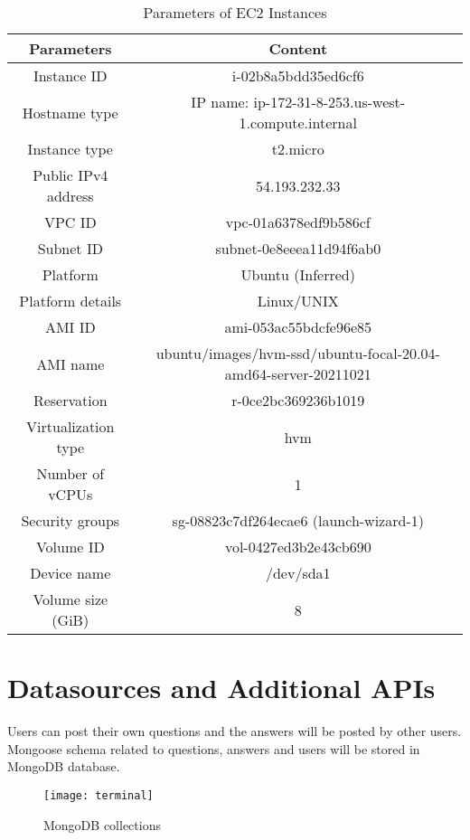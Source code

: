 \documentclass[11pt]{article}
\begin{document}
\begin{table}[h!]
\centering
\begin{tabular}{|c|c|}
    \hline
    Parameters & Content \\ \hline\hline
    Instance ID   & i-02b8a5bdd35ed6cf6 \\ \hline
    Hostname type & IP name: ip-172-31-8-253.us-west-1.compute.internal \\ \hline
    Instance type & t2.micro \\ \hline
    Public IPv4 address & 54.193.232.33\\ \hline
    VPC ID & vpc-01a6378edf9b586cf \\ \hline
    Subnet ID & subnet-0e8eeea11d94f6ab0 \\ \hline
    Platform &  Ubuntu (Inferred) \\ \hline
    Platform details &  Linux/UNIX \\ \hline
    AMI ID &  ami-053ac55bdcfe96e85 \\ \hline
    AMI name &  ubuntu/images/hvm-ssd/ubuntu-focal-20.04-amd64-server-20211021\\ \hline
    Reservation & r-0ce2bc369236b1019\\ \hline
    Virtualization type &  hvm \\ \hline
    Number of vCPUs & 1 \\ \hline
    Security groups & sg-08823c7df264ecae6 (launch-wizard-1) \\ \hline
    Volume ID & vol-0427ed3b2e43cb690 \\ \hline
    Device name & /dev/sda1 \\ \hline
    Volume size (GiB) & 8 \\ \hline
    
\end{tabular}
\caption{Parameters of EC2 Instances}

\label{table:1}
\end{table}

\newpage
\section{Datasources and Additional APIs}
Users can post their own questions and the answers will be posted by other users. Mongoose schema related to questions, answers and users will be stored in MongoDB database. 


\begin{figure}[htp]
    \centering
    \texttt{[image: terminal]}
    \caption{MongoDB collections}
    \label{fig:galaxy}
\end{figure}
\end{document}
